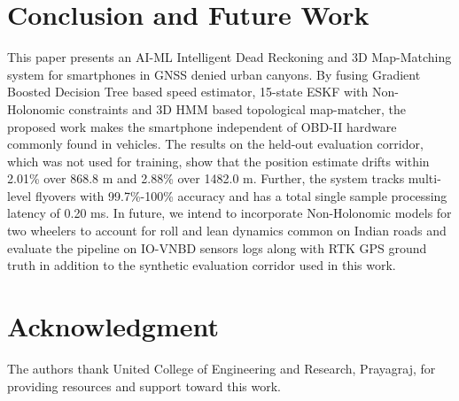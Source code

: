 \section{Conclusion and Future Work}

This paper presents an AI-ML Intelligent Dead Reckoning and 3D Map-Matching system for smartphones in GNSS denied urban canyons. By fusing Gradient Boosted Decision Tree based speed estimator, 15-state ESKF with Non-Holonomic constraints and 3D HMM based topological map-matcher, the proposed work makes the smartphone independent of OBD-II hardware commonly found in vehicles. The results on the held-out evaluation corridor, which was not used for training, show that the position estimate drifts within 2.01\% over 868.8 m and 2.88\% over 1482.0 m. Further, the system tracks multi-level flyovers with 99.7\%-100\% accuracy and has a total single sample processing latency of 0.20 ms. In future, we intend to incorporate Non-Holonomic models for two wheelers to account for roll and lean dynamics common on Indian roads and evaluate the pipeline on IO-VNBD sensors logs along with RTK GPS ground truth in addition to the synthetic evaluation corridor used in this work.

\section*{Acknowledgment}
The authors thank United College of Engineering and Research, Prayagraj, for providing resources and support toward this work.

